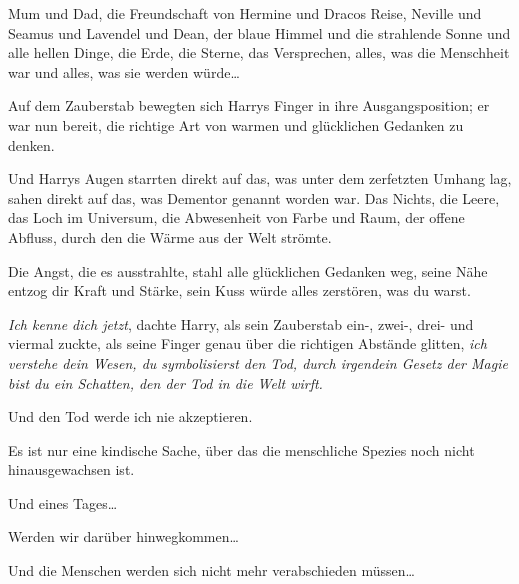 Mum und Dad, die Freundschaft von Hermine und Dracos Reise, Neville und Seamus und Lavendel und Dean, der blaue Himmel und die strahlende Sonne und alle hellen Dinge, die Erde, die Sterne, das Versprechen, alles, was die Menschheit war und alles, was sie werden würde…

Auf dem Zauberstab bewegten sich Harrys Finger in ihre Ausgangsposition; er war nun bereit, die richtige Art von warmen und glücklichen Gedanken zu denken.

Und Harrys Augen starrten direkt auf das, was unter dem zerfetzten Umhang lag, sahen direkt auf das, was Dementor genannt worden war. Das Nichts, die Leere, das Loch im Universum, die Abwesenheit von Farbe und Raum, der offene Abfluss, durch den die Wärme aus der Welt strömte.

Die Angst, die es ausstrahlte, stahl alle glücklichen Gedanken weg, seine Nähe entzog dir Kraft und Stärke, sein Kuss würde alles zerstören, was du warst.

\emph{Ich kenne dich jetzt}, dachte Harry, als sein Zauberstab ein-, zwei-, drei- und viermal zuckte, als seine Finger genau über die richtigen Abstände glitten, \emph{ich verstehe dein Wesen, du symbolisierst den Tod, durch irgendein Gesetz der Magie bist du ein Schatten, den der Tod in die Welt wirft.}

\begin{em}
Und den Tod werde ich nie akzeptieren.

Es ist nur eine kindische Sache, über das die menschliche Spezies noch nicht hinausgewachsen ist.

Und eines Tages…

Werden wir darüber hinwegkommen…

Und die Menschen werden sich nicht mehr verabschieden müssen…
\end{em}


